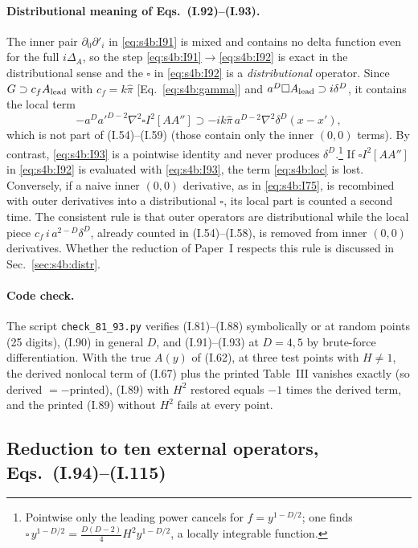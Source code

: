 \documentclass[aps,prd,onecolumn,10pt,nofootinbib,floatfix]{revtex4-2}
\newcommand{\PI}{Paper~I}
\newcommand{\eqI}[1]{(I.#1)}
\newcommand{\pihat}{\hat\pi}
\begin{document}
\paragraph*{Distributional meaning of Eqs.~(I.92)--(I.93).}
The inner pair $\partial_0\partial'_i$ in \eqref{eq:s4b:I91} is mixed and contains no delta function even for the full
$i\Delta_A$, so the step \eqref{eq:s4b:I91}$\to$\eqref{eq:s4b:I92} is exact in the distributional sense and the
$\square$ in \eqref{eq:s4b:I92} is a \emph{distributional} operator. Since $G\supset c_fA_{\rm lead}$ with $c_f=k\pihat$
[Eq.~\eqref{eq:s4b:gamma}] and $a^D\square A_{\rm lead}\supset i\delta^D$, it contains the local term
\begin{equation}
-a^Da'^{D-2}\nabla^2\square I^2[AA'']\supset-ik\pihat\,a^{D-2}\nabla^2\delta^D(x-x'),
\label{eq:s4b:loc}
\end{equation}
which is not part of \eqI{54}--\eqI{59} (those contain only the inner $(0,0)$ terms). By contrast, \eqref{eq:s4b:I93}
is a pointwise identity and never produces $\delta^D$.\footnote{Pointwise only the leading power cancels for
$f=y^{1-D/2}$; one finds $\square\,y^{1-D/2}=\tfrac{D(D-2)}{4}H^2y^{1-D/2}$, a locally integrable function.} If
$\square I^2[AA'']$ in \eqref{eq:s4b:I92} is evaluated with \eqref{eq:s4b:I93}, the term \eqref{eq:s4b:loc} is lost.
Conversely, if a naive inner $(0,0)$ derivative, as in \eqref{eq:s4b:I75}, is recombined with outer derivatives into a
distributional $\square$, its local part is counted a second time. The consistent rule is that outer operators are
distributional while the local piece $c_f\,i\,a^{2-D}\delta^D$, already counted in \eqI{54}--\eqI{58}, is removed from
inner $(0,0)$ derivatives. Whether the reduction of \PI{} respects this rule is discussed in
Sec.~\ref{sec:s4b:distr}.

\paragraph*{Code check.}
The script \texttt{check\_81\_93.py} verifies \eqI{81}--\eqI{88} symbolically or at random points (25 digits), \eqI{90} in
general $D$, and \eqI{91}--\eqI{93} at $D=4,5$ by brute-force differentiation. With the true $A(y)$ of \eqI{62}, at three
test points with $H\neq1$, the derived nonlocal term of \eqI{67} plus the printed Table~III vanishes exactly (so
derived $=-$printed), \eqI{89} with $H^2$ restored equals $-1$ times the derived term, and the printed \eqI{89}
without $H^2$ fails at every point.

\subsection{Reduction to ten external operators, Eqs.~(I.94)--(I.115)}
\label{sec:s4b:operators}
\end{document}
